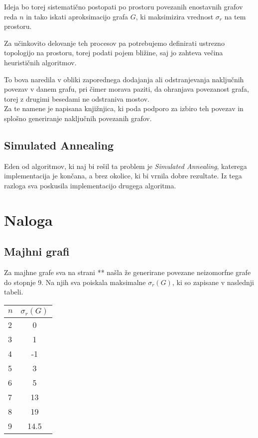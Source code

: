 \documentclass[ letterpaper, titlepage, fleqn]{article}
\begin{document}
Ideja bo torej sistematično postopati po prostoru povezanih enostavnih grafov reda $n$ in 
tako iskati aproksimacijo grafa $G$, ki maksimizira vrednost $\sigma_r$ na tem prostoru.

Za učinkovito delovanje teh procesov pa potrebujemo definirati ustrezno topologijo 
na prostoru, torej podati pojem bližine, saj jo zahteva večina heurističnih algoritmov.

To bova naredila v obliki zaporednega dodajanja ali odstranjevanja naključnih povezav v 
danem grafu, pri čimer morava paziti, da ohranjava povezanost grafa, 
torej z drugimi besedami ne odstraniva mostov.\\
Za te namene je napisana knjižnjica, ki poda podporo za izbiro teh povezav
in splošno generiranje naključnih povezanih grafov.

\subsection{Simulated Annealing}
Eden od algoritmov, ki naj bi rešil ta problem je {\em Simulated Annealing}, 
katerega implementacija je končana, a brez okolice, ki bi vrnila dobre rezultate.
Iz tega razloga sva poskusila implementacijo drugega algoritma.

\section{Naloga}

\subsection{Majhni grafi}
Za majhne grafe sva na strani ** našla že generirane povezane neizomorfne grafe do stopnje 9.
Na njih sva poiskala maksimalne $\sigma_r(G)$, ki so zapisane v naslednji tabeli.

\begin{center}
    \begin{tabular}{|  l | c | }
      \hline
      $n$ & $\sigma_r(G)$ \\ \hline
      2 & 0 \\ 
      3 & 1 \\ 
      4 & -1 \\ 
      5 & 3 \\ 
      6 & 5 \\ 
      7 & 13 \\ 
      8 & 19 \\ 
      9 & 14.5 \\ 
      \hline
    \end{tabular}
  \end{center}
\end{document}
